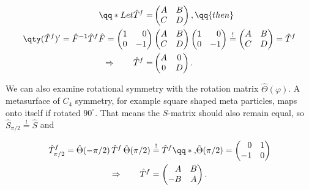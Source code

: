 \begin{equation}
\begin{aligned}
    \qq*{Let} \hat T^f =
    &\begin{pmatrix}
        A & B \\
        C & D
    \end{pmatrix},
    \qq{then} \\
    \qty(\hat T^f)' =
    \hat F^{-1} \hat T^f \hat F =
    \begin{pmatrix}
        1 & \phantom{-} 0 \\
        0 & -           1
    \end{pmatrix}
    &\begin{pmatrix}
        A & B \\
        C & D
    \end{pmatrix}
    \begin{pmatrix}
        1 & \phantom{-} 0 \\
        0 & -           1
    \end{pmatrix}
    \stackrel{!}{=}
    \begin{pmatrix}
        A & B \\
        C & D
    \end{pmatrix} =
    \hat T^f \\
    \Rightarrow \qquad
    \hat T^f =
    &\begin{pmatrix}
        A & 0 \\
        0 & D
    \end{pmatrix}.
\end{aligned}
\end{equation}

We can also examine rotational symmetry with the rotation matrix $\hat \Theta(\varphi)$. A metasurface of $C_4$ symmetry, for example square shaped meta particles, maps onto itself if rotated $90^\circ$. That means the $S$-matrix should also remain equal, so
$\hat S_{\pi/2} \stackrel{!}{=} \hat S$
and

\begin{equation}
\begin{aligned}
    \hat T^f_{\pi/2} =
    \hat \Theta(-\pi/2) \,
    \hat T^f \,
    \hat \Theta(\pi/2)
    &\stackrel{!}{=}
    \hat T^f
    \qq*{,}
    \hat \Theta(\pi/2) =
    \begin{pmatrix}
        \phantom{-} 0 & 1 \\
        -1 & 0
    \end{pmatrix} \\
    \Rightarrow \qquad
    \hat T^f &=
    \begin{pmatrix}
        \phantom{-} A & B \\
        -           B & A
    \end{pmatrix}.
\end{aligned}
\end{equation}

